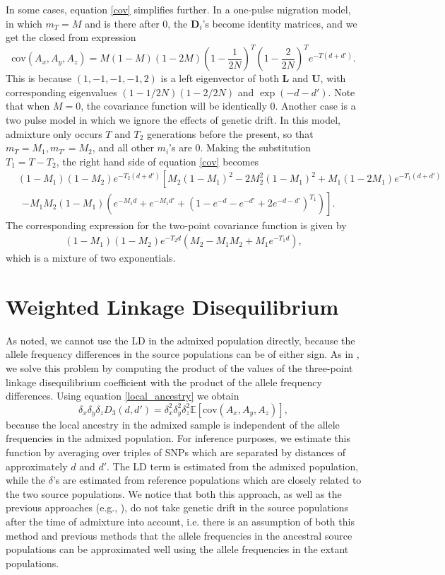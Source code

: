 \documentclass[10pt]{article}
\begin{document}
In some cases, equation \ref{cov} simplifies further. In a one-pulse migration
model, in which $m_T=M$ and is there after 0, the $\mathbf{D}_i$'s become
identity matrices, and we get the closed from expression $$
\text{cov}(A_x,A_y,A_z) =
M(1-M)(1-2M)\left(1-\frac{1}{2N}\right)^T\left(1-\frac{2}{2N}\right)^Te^{-T(d+d')}. $$
This is because $(1,-1,-1,-1,2)$ is a left eigenvector of both $\mathbf{L}$ and
$\mathbf{U}$, with corresponding eigenvalues $(1-1/2N)(1-2/2N)$ and
$\exp(-d-d')$. Note that when $M=0$, the covariance function will be identically
0. Another case is a two pulse model in which we ignore the effects of genetic
drift. In this model, admixture only occurs $T$ and $T_2$ generations before the
present, so that $m_T=M_1,m_{T'}=M_2$, and all other $m_i$'s are 0. Making the
substitution $T_1=T-T_2$, the right hand side of equation \ref{cov} becomes
\begin{align}
&(1-M_1)(1-M_2)e^{-T_2(d+d')}\left[M_2(1-M_1)^2-2M_2^2(1-M_1)^2+M_1(1-2M_1)e^{-T_1(d+d')}\right.\nonumber\\ &\ \
\left.-M_1M_2(1-M_1)\left(e^{-M_1d}+e^{-M_1
d'}+\left(1-e^{-d}-e^{-d'}+2e^{-d-d'}\right)^{T_1}\right) \right]. \label
{ash_2p} \end{align} The corresponding expression for the two-point covariance
function is given by \begin{align}
(1-M_1)(1-M_2)e^{-T_2d}\left(M_2-M_1M_2+M_1e^{-T_1d}\right), \label{alder_2p}
\end{align} which is a mixture of two exponentials.

\section{Weighted Linkage Disequilibrium} As \cite{loh2013inferring} noted, we
cannot use the LD in the admixed population directly, because the allele
frequency differences in the source populations can be of either sign. As in
\cite{loh2013inferring} , we solve this problem by computing the product of the
values of the three-point linkage disequilibrium coefficient with the product of
the allele frequency differences. Using equation \ref{local_ancestry} we obtain $$
\delta_x\delta_y\delta_z
D_3(d,d')=\delta_x^2\delta_y^2\delta_z^2\mathbb{E}[\text{cov}(A_x,A_y,A_z)], $$
because the local ancestry in the admixed sample is independent of the allele
frequencies in the admixed population. For inference purposes, we estimate this
function by averaging over triples of SNPs which are separated by distances of
approximately $d$ and $d'$. The LD term is estimated from the admixed
population, while the $\delta$'s are estimated from reference populations which
are closely related to the two source populations. We notice that both this
approach, as well as the previous approaches (e.g., \cite{loh2013inferring} ),
do not take genetic drift in the source populations after the time of
admixture into account, i.e. there is an assumption of both this method and
previous methods that the allele frequencies in the ancestral source populations
can be approximated well using the allele frequencies in the extant populations.
\end{document}
